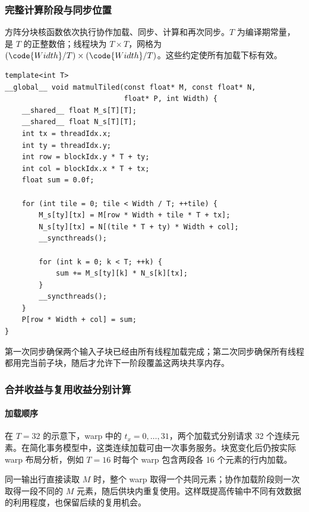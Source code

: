 \subsubsection{完整计算阶段与同步位置}
\par\noindent\begin{minipage}{\linewidth}
方阵分块核函数依次执行协作加载、同步、计算和再次同步。$T$ 为编译期常量， 是 $T$ 的正整数倍；线程块为 $T\times T$，网格为 $(\code{Width}/T)\times(\code{Width}/T)$。这些约定使所有加载下标有效。

\begin{lstlisting}[caption={包含协作加载、两次同步和输出写回的分块矩阵乘法。}]
template<int T>
__global__ void matmulTiled(const float* M, const float* N,
                            float* P, int Width) {
    __shared__ float M_s[T][T];
    __shared__ float N_s[T][T];
    int tx = threadIdx.x;
    int ty = threadIdx.y;
    int row = blockIdx.y * T + ty;
    int col = blockIdx.x * T + tx;
    float sum = 0.0f;

    for (int tile = 0; tile < Width / T; ++tile) {
        M_s[ty][tx] = M[row * Width + tile * T + tx];
        N_s[ty][tx] = N[(tile * T + ty) * Width + col];
        __syncthreads();

        for (int k = 0; k < T; ++k) {
            sum += M_s[ty][k] * N_s[k][tx];
        }
        __syncthreads();
    }
    P[row * Width + col] = sum;
}
\end{lstlisting}
\end{minipage}\par

第一次同步确保两个输入子块已经由所有线程加载完成；第二次同步确保所有线程都用完当前子块，随后才允许下一阶段覆盖这两块共享内存。

\subsubsection{合并收益与复用收益分别计算}
\paragraph{加载顺序}
在 $T=32$ 的示意下，warp 中的 $t_x=0,\ldots,31$，两个加载式分别请求 32 个连续元素。在简化事务模型中，这类连续加载可由一次事务服务。块宽变化后仍按实际 warp 布局分析，例如 $T=16$ 时每个 warp 包含两段各 16 个元素的行内加载。

同一输出行直接读取 $M$ 时，整个 warp 取得一个共同元素；协作加载阶段则一次取得一段不同的 $M$ 元素，随后供块内重复使用。这样既提高传输中不同有效数据的利用程度，也保留后续的复用机会。

